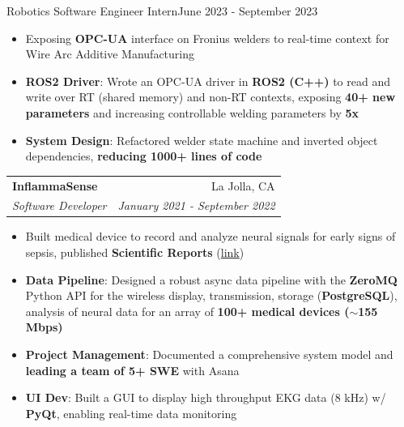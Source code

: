 \documentclass[letterpaper,11pt]{article}
\makeatletter
\newcommand{\resumeItem}[2]{
  \item\small{
    \textbf{#1}{: #2 \vspace{-3pt}}
  }
}
\newcommand{\subItem}[1]{
  \item\small{
    {#1 \vspace{-2pt}}
  }
}
\newcommand{\resumeSubheading}[4]{
  \vspace{0pt}\item
    \begin{tabular*}{0.97\textwidth}{l@{\extracolsep{\fill}}r}\vspace{-2pt}
      \textbf{#1} & #2 \\\vspace{-2pt}
      \textit{\small#3} & \textit{\small #4} \\
    \end{tabular*}\vspace{-6pt}
}
\newcommand{\resumeItemListStart}{\begin{itemize}[leftmargin=1.5em]}
\newcommand{\resumeItemListEnd}{\end{itemize}\vspace{-6pt}}
\makeatother
\begin{document}
      {Robotics Software Engineer Intern}{June 2023 - September 2023}
      \resumeItemListStart
        \subItem
          {Exposing \textbf{OPC-UA} interface on Fronius welders to real-time context for Wire Arc Additive Manufacturing}
        \resumeItem{ROS2 Driver}
          {Wrote an OPC-UA driver in \textbf{ROS2 (C++)} to read and write over RT (shared memory) and non-RT contexts, exposing \textbf{40+ new parameters} and increasing controllable welding parameters by \textbf{5x}}
        \resumeItem{System Design}
          {Refactored welder state machine and inverted object dependencies, \textbf{reducing 1000+ lines of code}}
      \resumeItemListEnd
    \resumeSubheading
      {InflammaSense}{La Jolla, CA}
      {Software Developer}{January 2021 - September 2022}
      \resumeItemListStart
        \subItem
          {Built medical device to record and analyze neural signals for early signs of sepsis, published \textbf{Scientific Reports} (\href{https://www.nature.com/articles/s41598-022-21817-w}{link})}
        \resumeItem{Data Pipeline}
          {Designed a robust async data pipeline with the \textbf{ZeroMQ} Python API for the wireless display, transmission, storage (\textbf{PostgreSQL}), analysis of neural data for an array of \textbf{100+ medical devices (\texttt{$\sim$}155 Mbps)}}
        \resumeItem{Project Management}
          {Documented a comprehensive system model and \textbf{leading a team of 5+ SWE} with Asana}
        \resumeItem{UI Dev}
          {Built a GUI to display high throughput EKG data (8 kHz) w/ \textbf{PyQt}, enabling real-time data monitoring}
      \resumeItemListEnd
\end{document}
